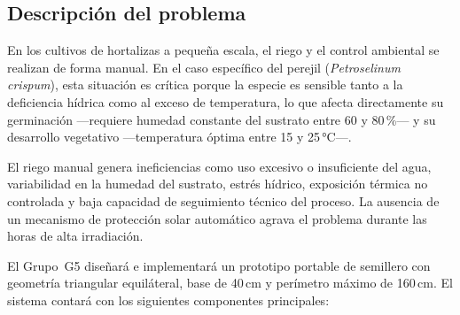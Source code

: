
\setlength{\parskip}{6pt}


\setlength{\parindent}{15pt}

\subsection{Descripción del problema}

En los cultivos de hortalizas a pequeña escala, el riego y el control ambiental se realizan de forma manual. En el caso específico del perejil (\textit{Petroselinum crispum}), esta situación es crítica porque la especie es sensible tanto a la deficiencia hídrica como al exceso de temperatura, lo que afecta directamente su germinación —requiere humedad constante del sustrato entre 60 y 80\,\%— y su desarrollo vegetativo —temperatura óptima entre 15 y 25\,°C—.

El riego manual genera ineficiencias como uso excesivo o insuficiente del agua, variabilidad en la humedad del sustrato, estrés hídrico, exposición térmica no controlada y baja capacidad de seguimiento técnico del proceso. La ausencia de un mecanismo de protección solar automático agrava el problema durante las horas de alta irradiación.

El Grupo~G5 diseñará e implementará un prototipo portable de semillero con geometría triangular equiláteral, base de 40\,cm y perímetro máximo de 160\,cm. El sistema contará con los siguientes componentes principales:


